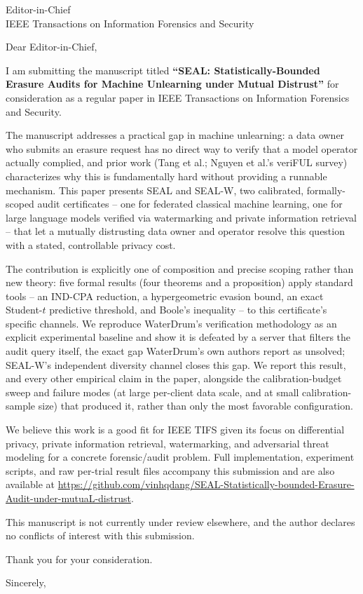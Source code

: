 \documentclass[11pt]{letter}
\begin{document}
\begin{letter}{Editor-in-Chief \\ IEEE Transactions on Information Forensics and Security}

\opening{Dear Editor-in-Chief,}

I am submitting the manuscript titled \textbf{``SEAL: Statistically-Bounded Erasure Audits for Machine Unlearning under Mutual Distrust''} for consideration as a regular paper in IEEE Transactions on Information Forensics and Security.

The manuscript addresses a practical gap in machine unlearning: a data owner who submits an erasure request has no direct way to verify that a model operator actually complied, and prior work (Tang et al.; Nguyen et al.'s veriFUL survey) characterizes why this is fundamentally hard without providing a runnable mechanism. This paper presents SEAL and SEAL-W, two calibrated, formally-scoped audit certificates -- one for federated classical machine learning, one for large language models verified via watermarking and private information retrieval -- that let a mutually distrusting data owner and operator resolve this question with a stated, controllable privacy cost.

The contribution is explicitly one of composition and precise scoping rather than new theory: five formal results (four theorems and a proposition) apply standard tools -- an IND-CPA reduction, a hypergeometric evasion bound, an exact Student-$t$ predictive threshold, and Boole's inequality -- to this certificate's specific channels. We reproduce WaterDrum's verification methodology as an explicit experimental baseline and show it is defeated by a server that filters the audit query itself, the exact gap WaterDrum's own authors report as unsolved; SEAL-W's independent diversity channel closes this gap. We report this result, and every other empirical claim in the paper, alongside the calibration-budget sweep and failure modes (at large per-client data scale, and at small calibration-sample size) that produced it, rather than only the most favorable configuration.

We believe this work is a good fit for IEEE TIFS given its focus on differential privacy, private information retrieval, watermarking, and adversarial threat modeling for a concrete forensic/audit problem. Full implementation, experiment scripts, and raw per-trial result files accompany this submission and are also available at \url{https://github.com/vinhqdang/SEAL-Statistically-bounded-Erasure-Audit-under-mutuaL-distrust}.

This manuscript is not currently under review elsewhere, and the author declares no conflicts of interest with this submission.

Thank you for your consideration.

\closing{Sincerely,}

\end{letter}
\end{document}
